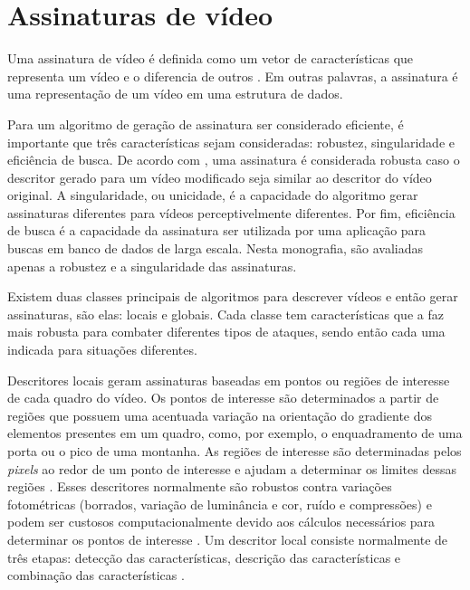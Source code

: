 \section{Assinaturas de vídeo}
\label{sec:assinatura} 
    
	Uma assinatura de vídeo é definida como um vetor de características que representa um vídeo e o diferencia de outros \cite{lee2008robust}. Em outras palavras, a assinatura é uma representação de um vídeo em uma estrutura de dados. 
        
	Para um algoritmo de geração de assinatura ser considerado eficiente, é importante que três características sejam consideradas: robustez, singularidade e eficiência de busca. De acordo com , uma assinatura é considerada robusta caso o descritor gerado para um vídeo modificado seja similar ao descritor do vídeo original. A singularidade, ou unicidade, é a capacidade do algoritmo gerar assinaturas diferentes para vídeos perceptivelmente diferentes. Por fim, eficiência de busca é a capacidade da assinatura  ser utilizada por uma aplicação para buscas em banco de dados de larga escala. Nesta monografia, são avaliadas apenas a robustez e a singularidade das assinaturas.   

    Existem duas classes principais de algoritmos para descrever vídeos e então gerar assinaturas, são elas: locais e globais. Cada classe tem características que a faz mais robusta para combater diferentes tipos de ataques, sendo então cada uma indicada para situações diferentes.
    
    Descritores locais geram assinaturas baseadas em pontos ou regiões de interesse de cada quadro do vídeo. Os pontos de interesse são determinados a partir de regiões que possuem uma acentuada variação na orientação do gradiente dos elementos presentes em um quadro, como, por exemplo, o enquadramento de uma porta ou o pico de uma montanha. As regiões de interesse são determinadas pelos \textit{pixels} ao redor de um ponto de interesse e ajudam a determinar os limites dessas regiões \cite{radhakrishnan2007content}. Esses descritores normalmente são robustos contra variações fotométricas (borrados, variação de luminância e cor, ruído e compressões) e podem ser custosos computacionalmente devido aos cálculos necessários para determinar os pontos de interesse \cite{naini2014vanishing}. Um descritor local consiste normalmente de três etapas: detecção das características, descrição das características e combinação das características \cite{chen2010zernike}.

